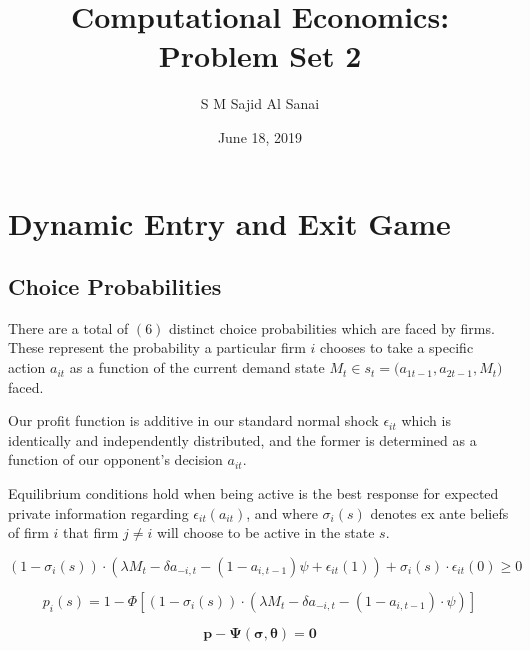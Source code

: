 \documentclass{article}
\title{Computational Economics: Problem Set 2}
\author{S M Sajid Al Sanai}
\date{June 18, 2019}
\begin{document}
\maketitle
{}
\tableofcontents


\newpage

\section{Dynamic Entry and Exit Game}

\subsection{Choice Probabilities}

There are a total of $(6)$ distinct choice probabilities which are faced by firms. These represent the probability a particular firm $i$ chooses to take a specific action $a_{it}$ as a function of the current demand state $M_{t} \in s_t=\big( a_{1t-1}, a_{2t-1}, M_t \big)$ faced.

Our profit function is additive in our standard normal shock $\epsilon_{it}$ which is identically and independently distributed, and the former is determined as a function of our opponent's decision $a_{it}$.

Equilibrium conditions hold when being active is the best response for expected private information regarding $\epsilon_{it}(a_{it})$, and where $\sigma_i(s)$ denotes ex ante beliefs of firm $i$ that firm $j \neq i$ will choose to be active in the state $s$.

\begin{equation}
( 1-\sigma_i(s) ) \cdot (\lambda M_t - \delta a_{-i,t}-(1-a_{i,t-1})\psi + \epsilon_{it}(1)) + \sigma_i(s) \cdot \epsilon_{it}(0) \geq 0
\end{equation}

\begin{equation}
p_i(s)=1-\Phi[ ( 1-\sigma_i(s) ) \cdot (\lambda M_t - \delta a_{-i,t}-(1-a_{i,t-1}) \cdot \psi)]
\end{equation}

\begin{equation}
\mathbf{p-\Psi(\sigma,\theta)=0}
\end{equation}
\end{document}
